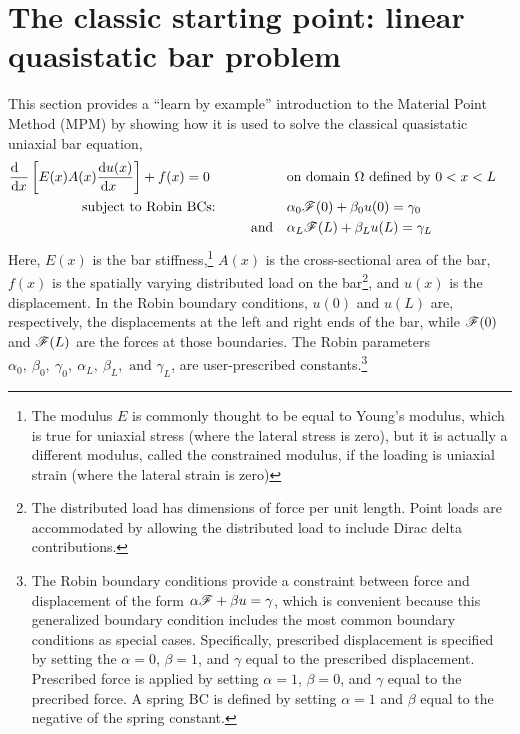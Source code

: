 \newcommand{\tractionForce}{\mathscript{F}}
\section{The classic starting point: linear quasistatic \oneD bar problem}
This section provides a ``learn by example'' introduction to the Material Point Method (MPM) by showing how it is used to solve the classical quasistatic uniaxial bar equation,
\begin{equation}
\Bal
  &\frac{\dd~~}{\dd x}\left[E(x)A(x) \frac{\dd u(x)}{\dd x~~~}\right]+f(x)=0 \qquad  &          &\text{on domain $\Omega$ defined by }0<x<L& \\
  &\text{~~~~~~~~~~~~~~~~subject to Robin BCs: }
       &&\alpha_0 \tractionForce(0)+\beta_0 u(0)=\gamma_0 \\
       &&\text{and ~~}&\alpha_L \tractionForce(L)+\beta_L u(L)=\gamma_L 
\Eal
\label{eq:LinearBarStrongForm}
\end{equation}
Here, $E(x)$ is the bar stiffness,\footnote{The modulus $E$ is commonly thought to be equal to Young's modulus, which is true for uniaxial stress (where the lateral stress is zero), but it is actually a different modulus, called the constrained modulus, if the loading is uniaxial strain (where the lateral strain is zero)} 
%
$A(x)$ is the cross-sectional area of the bar, 
%
$f(x)$ is the spatially varying distributed load on the bar\footnote{The distributed load has dimensions of force per unit length. Point loads are accommodated by allowing the distributed load to include Dirac delta contributions.}, 
%
and $u(x)$ is the displacement.  
%
In the Robin boundary conditions, $u(0)$ and $u(L)$ are, respectively, the displacements at the left and right ends of the bar, while $\tractionForce(0)$ and $\tractionForce(L)$ are the forces at those boundaries. The Robin parameters $\alpha_0,~\beta_0,~\gamma_0,~\alpha_L,~\beta_L, \text{ and } \gamma_L$, are user-prescribed constants.\footnote{The Robin boundary conditions provide a constraint between force and displacement of the form $\alpha \tractionForce+\beta u=\gamma$, which is convenient because this generalized boundary condition includes the most common boundary conditions as special cases. Specifically, prescribed displacement is specified by setting the $\alpha=0$, $\beta=1$, and $\gamma$ equal to the prescribed displacement. Prescribed force is applied by setting $\alpha=1$, $\beta=0$, and $\gamma$ equal to the precribed force.  A spring BC is defined by setting $\alpha=1$ and $\beta$ equal to the negative of the spring constant.} 

